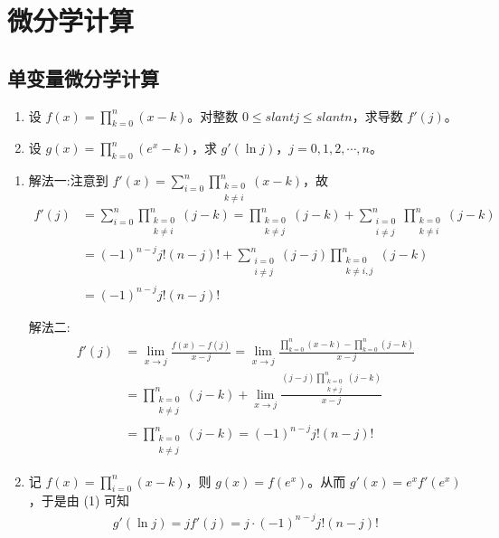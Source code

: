 \documentclass[../../main.tex]{subfiles}
\begin{document}
\section{微分学计算}

\subsection{单变量微分学计算}

\begin{example}
\begin{enumerate}[(1)]
\item 设 \( f(x) = \prod_{k=0}^{n} (x - k) \)。对整数 \( 0 \leqslant slant j \leqslant slant n \)，求导数 \( f'(j) \)。

\item 设 \( g(x) = \prod_{k=0}^{n} (e^x - k) \)，求 \( g'(\ln j) \)，\( j = 0, 1, 2, \cdots, n \)。
\end{enumerate}
\end{example}
\begin{solution}
\begin{enumerate}[(1)]
\item {\color{blue} 解法一:}注意到 \( f'(x) = \sum_{i=0}^{n} \prod_{\substack{k=0 \\ k \neq i}}^{n} (x - k) \)，故
\begin{align*}
f'(j) &= \sum_{i=0}^{n} \prod_{\substack{k=0 \\ k \neq i}}^{n} (j - k) = \prod_{\substack{k=0 \\ k \neq j}}^{n} (j - k) + \sum_{\substack{i=0 \\ i \neq j}}^{n} \prod_{\substack{k=0 \\ k \neq i}}^{n} (j - k) \\
&= (-1)^{n - j} j! (n - j)! + \sum_{\substack{i=0 \\ i \neq j}}^{n} (j - j) \prod_{\substack{k=0 \\ k \neq i, j}}^{n} (j - k) \\
&= (-1)^{n - j} j! (n - j)!
\end{align*}

{\color{blue} 解法二:}\begin{align*}
f'(j) &= \lim_{x \to j} \frac{f(x) - f(j)}{x - j} = \lim_{x \to j} \frac{\prod\limits_{k=0}^{n} (x - k) - \prod\limits_{k=0}^{n} (j - k)}{x - j} \\
&= \prod_{\substack{k=0 \\ k \neq j}}^{n} (j - k) + \lim_{x \to j} \frac{(j - j) \prod\limits_{\substack{k=0 \\ k \neq j}}^{n} (j - k)}{x - j} \\
&= \prod_{\substack{k=0 \\ k \neq j}}^{n} (j - k) = (-1)^{n - j} j! (n - j)!
\end{align*}

\item 记 \( f(x) = \prod_{i=0}^{n} (x - k) \)，则 \( g(x) = f(e^x) \)。从而 \( g'(x) = e^x f'(e^x) \)，于是由 (1) 可知
\begin{align*}
g'(\ln j) = j f'(j) = j \cdot (-1)^{n - j} j! (n - j)!
\end{align*}
\end{enumerate}
\end{solution}
\end{document}
